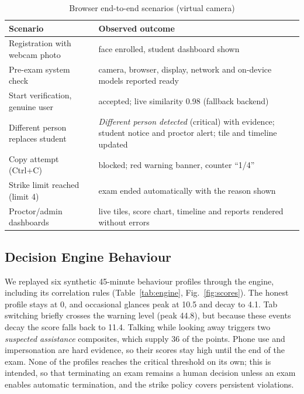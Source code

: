 \documentclass[conference]{IEEEtran}
\begin{document}
\begin{table}[t]
\caption{Browser end-to-end scenarios (virtual camera)}
\label{tab:e2e}
\centering
\footnotesize
\begin{tabular}{@{}p{3.1cm}p{4.9cm}@{}}
\toprule
\textbf{Scenario} & \textbf{Observed outcome} \\
\midrule
Registration with webcam photo & face enrolled, student dashboard shown \\
Pre-exam system check & camera, browser, display, network and on-device models reported ready \\
Start verification, genuine user & accepted; live similarity 0.98 (fallback backend) \\
Different person replaces student & \emph{Different person detected} (critical) with evidence; student notice and proctor alert; tile and timeline updated \\
Copy attempt (Ctrl+C) & blocked; red warning banner, counter ``1/4'' \\
Strike limit reached (limit 4) & exam ended automatically with the reason shown \\
Proctor/admin dashboards & live tiles, score chart, timeline and reports rendered without errors \\
\bottomrule
\end{tabular}
\end{table}

\subsection{Decision Engine Behaviour}
We replayed six synthetic 45-minute behaviour profiles through the engine, including its correlation rules (Table~\ref{tab:engine}, Fig.~\ref{fig:scores}). The honest profile stays at 0, and occasional glances peak at 10.5 and decay to 4.1. Tab switching briefly crosses the warning level (peak 44.8), but because these events decay the score falls back to 11.4. Talking while looking away triggers two \emph{suspected assistance} composites, which supply 36 of the points. Phone use and impersonation are hard evidence, so their scores stay high until the end of the exam. None of the profiles reaches the critical threshold on its own; this is intended, so that terminating an exam remains a human decision unless an exam enables automatic termination, and the strike policy covers persistent violations.
\end{document}
